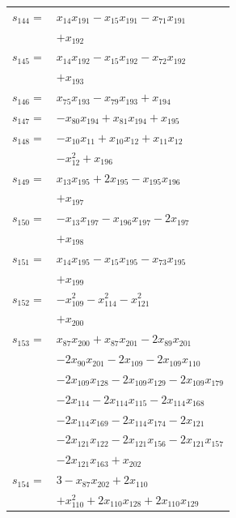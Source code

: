\begin{longtable}{@{}r@{\;}l@{}}
\(s_{144}=\) & \(\displaystyle x_{14}x_{191} -x_{15}x_{191} -x_{71}x_{191}\) \\
 & \(\displaystyle +x_{192}\) \\[3pt]
\(s_{145}=\) & \(\displaystyle x_{14}x_{192} -x_{15}x_{192} -x_{72}x_{192}\) \\
 & \(\displaystyle +x_{193}\) \\[3pt]
\(s_{146}=\) & \(\displaystyle x_{75}x_{193} -x_{79}x_{193} +x_{194}\) \\[3pt]
\(s_{147}=\) & \(\displaystyle -x_{80}x_{194} +x_{81}x_{194} +x_{195}\) \\[3pt]
\(s_{148}=\) & \(\displaystyle -x_{10}x_{11} +x_{10}x_{12} +x_{11}x_{12}\) \\
 & \(\displaystyle -x_{12}^{2} +x_{196}\) \\[3pt]
\(s_{149}=\) & \(\displaystyle x_{13}x_{195} +2x_{195} -x_{195}x_{196}\) \\
 & \(\displaystyle +x_{197}\) \\[3pt]
\(s_{150}=\) & \(\displaystyle -x_{13}x_{197} -x_{196}x_{197} -2x_{197}\) \\
 & \(\displaystyle +x_{198}\) \\[3pt]
\(s_{151}=\) & \(\displaystyle x_{14}x_{195} -x_{15}x_{195} -x_{73}x_{195}\) \\
 & \(\displaystyle +x_{199}\) \\[3pt]
\(s_{152}=\) & \(\displaystyle -x_{109}^{2} -x_{114}^{2} -x_{121}^{2}\) \\
 & \(\displaystyle +x_{200}\) \\[3pt]
\(s_{153}=\) & \(\displaystyle x_{87}x_{200} +x_{87}x_{201} -2x_{89}x_{201}\) \\
 & \(\displaystyle -2x_{90}x_{201} -2x_{109} -2x_{109}x_{110}\) \\
 & \(\displaystyle -2x_{109}x_{128} -2x_{109}x_{129} -2x_{109}x_{179}\) \\
 & \(\displaystyle -2x_{114} -2x_{114}x_{115} -2x_{114}x_{168}\) \\
 & \(\displaystyle -2x_{114}x_{169} -2x_{114}x_{174} -2x_{121}\) \\
 & \(\displaystyle -2x_{121}x_{122} -2x_{121}x_{156} -2x_{121}x_{157}\) \\
 & \(\displaystyle -2x_{121}x_{163} +x_{202}\) \\[3pt]
\(s_{154}=\) & \(\displaystyle 3 -x_{87}x_{202} +2x_{110}\) \\
 & \(\displaystyle +x_{110}^{2} +2x_{110}x_{128} +2x_{110}x_{129}\) \\

\end{longtable}

